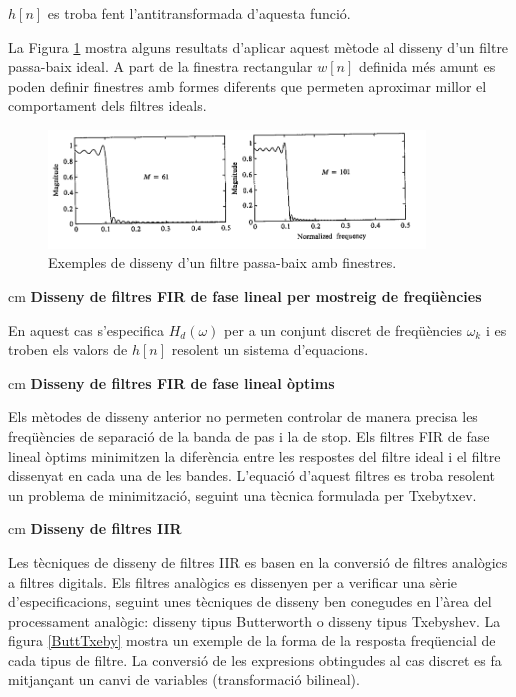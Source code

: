 \documentclass{article}
\begin{document}
\noindent
$h[n]$ es troba fent l'antitransformada d'aquesta funció.

La Figura \ref{exdissenyfinestra} mostra alguns resultats d'aplicar aquest mètode al disseny
d'un filtre passa-baix ideal. A part de la finestra rectangular $w[n]$ definida més amunt es poden definir
finestres amb formes diferents que permeten aproximar millor el comportament dels filtres ideals.


\begin{figure}[htbp]
\begin{center}
\includegraphics[width=10cm]{exdissenyfinestra.png}
\end{center}
\caption{Exemples de disseny d'un filtre passa-baix amb finestres.}
\label{exdissenyfinestra}
\end{figure}



 cm
\noindent
\textbf{Disseny de filtres FIR de fase lineal per mostreig de freqüències}

En aquest cas s'especifica $H_d(\omega)$ per a un conjunt discret de freqüències $\omega_k$
i es troben els valors de $h[n]$ resolent un sistema d'equacions.

 cm
\noindent
\textbf{Disseny de filtres FIR de fase lineal òptims}

Els mètodes de disseny anterior no permeten controlar de manera precisa les freqüències de
separació de la banda de pas i la de stop.
Els filtres FIR de fase lineal òptims minimitzen la diferència entre les respostes del filtre
ideal i el filtre dissenyat en cada una de les bandes. L'equació d'aquest filtres es troba
resolent un problema de minimització, seguint una tècnica formulada per Txebytxev.



 cm
\noindent
\textbf{Disseny de filtres IIR}

Les tècniques de disseny de filtres IIR es basen en la conversió de filtres analògics a filtres
digitals. Els filtres analògics es dissenyen per a verificar una sèrie d'especificacions,
seguint unes tècniques de disseny ben conegudes en l'àrea del processament analògic: disseny
tipus Butterworth o disseny tipus Txebyshev. La figura \ref{ButtTxeby} mostra un exemple
de la forma de la resposta freqüencial de cada tipus de filtre. La conversió de les expresions
obtingudes al cas discret es fa mitjançant un canvi de variables (transformació bilineal).
\end{document}

